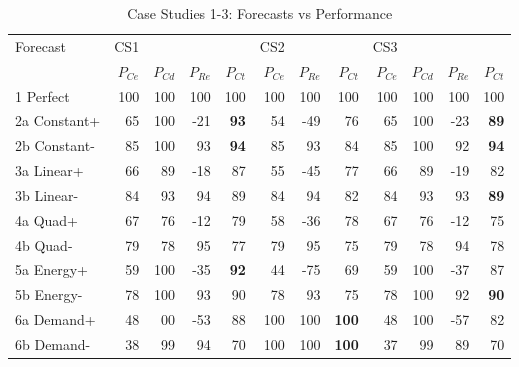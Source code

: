 \documentclass[conference]{IEEEtran}
\begin{document}
\begin{table}[t]%
    \centering
    \caption{Case Studies 1-3: Forecasts vs Performance}
    \label{tab:performance}
    \setlength{\tabcolsep}{1.5pt}
    \begin{tabular}{l r r r r r r r r r r r}
        Forecast            & CS1      &          &          &               & CS2      &          &               & CS3      &          &          &               \\ 
        ~            & $P_{Ce}$ & $P_{Cd}$ & $P_{Re}$ & $P_{Ct}$      & $P_{Ce}$ & $P_{Re}$ & $P_{Ct}$      & $P_{Ce}$ & $P_{Cd}$ & $P_{Re}$ & $P_{Ct}$      \\ \hline \hline
        1 Perfect    & 100      & 100      & 100      & 100           & 100      & 100      & 100           & 100      & 100      & 100      & 100           \\ \hline
        2a Constant+ & 65     & 100     & -21    & \textbf{93} & 54     & -49    & 76          & 65     & 100     & -23    & \textbf{89} \\
        2b Constant- & 85     & 100     & 93     & \textbf{94} & 85     & 93     & 84          & 85     & 100     & 92     & \textbf{94} \\ \hline
        3a Linear+   & 66     & 89     & -18    & 87          & 55     & -45    & 77          & 66     & 89     & -19    & 82          \\
        3b Linear-   & 84     & 93     & 94     & 89          & 84     & 94     & 82          & 84     & 93     & 93     & \textbf{89} \\ \hline
        4a Quad+     & 67     & 76     & -12    & 79          & 58     & -36    & 78          & 67     & 76     & -12    & 75          \\
        4b Quad-     & 79     & 78     & 95     & 77          & 79     & 95     & 75          & 79     & 78     & 94     & 78          \\ \hline
        5a Energy+   & 59     & 100     & -35    & \textbf{92} & 44     & -75    & 69          & 59     & 100     & -37    & 87          \\
        5b Energy-   & 78     & 100     & 93     & 90          & 78     & 93     & 75          & 78     & 100     & 92     & \textbf{90} \\ \hline
        6a Demand+   & 48     & 00     & -53    & 88          & 100     & 100     & \textbf{100} & 48     & 100     & -57    & 82          \\
        6b Demand-   & 38     & 99     & 94     & 70          & 100     & 100     & \textbf{100} & 37     & 99     & 89     & 70          \\ \hline

\end{tabular}
\end{table}
\end{document}

